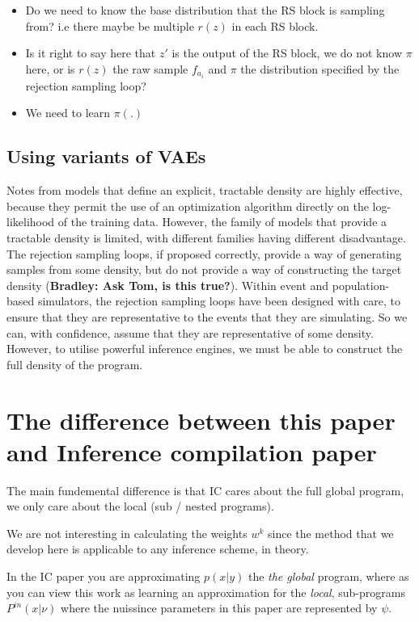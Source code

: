 \documentclass{article}
\begin{document}
\begin{itemize}
  \item Do we need to know the base distribution that the RS block is sampling from? i.e there maybe be multiple $r(z)$ in each 
  RS block. 
  \item Is it right to say here that $z\prime$ is the output of the RS block, we do not know $\pi$ here, or is $r(z)$ the raw sample $f_{a_i}$ and $\pi$ the distribution specified by the rejection sampling loop? 
  \item We need to learn $\pi(.)$
\end{itemize}
\subsection{Using variants of VAEs}

Notes from models that define an explicit,  
tractable density are highly effective, 
because they permit the use of an optimization algorithm directly on the log-likelihood of the training data.
However,  the  family  of  models  that provide  a  tractable  density  is  limited,
with  different  families  having  different disadvantage.
The rejection sampling loops, if proposed correctly, provide a way of generating 
samples from some density, but do not provide a way of constructing the target density (\textbf{Bradley: Ask Tom, is this true?}). 
Within event and population-based simulators, the rejection sampling loops have been designed with care,
to ensure that they are representative to the events that they are simulating. So we can, with confidence,
assume that they are representative of some density. 
However, to utilise powerful inference engines, we must be able to construct the 
full density of the program. 


\section{The difference between this paper and Inference compilation paper}

The main fundemental difference is that IC cares about the full global program, 
we only care about the local (sub / nested programs). 

We are not interesting in calculating the weights $w^k$ since the method that we 
develop here is applicable to any inference scheme, in theory. 

In the IC paper you are approximating $p(x|y)$ the \emph{the global} program, where 
as you can view this work as learning an approximation for the \emph{local}, sub-programs
$P^{in}(x|\nu)$ where the nuissince parameters in this paper are represented by $\psi$.
\end{document}
